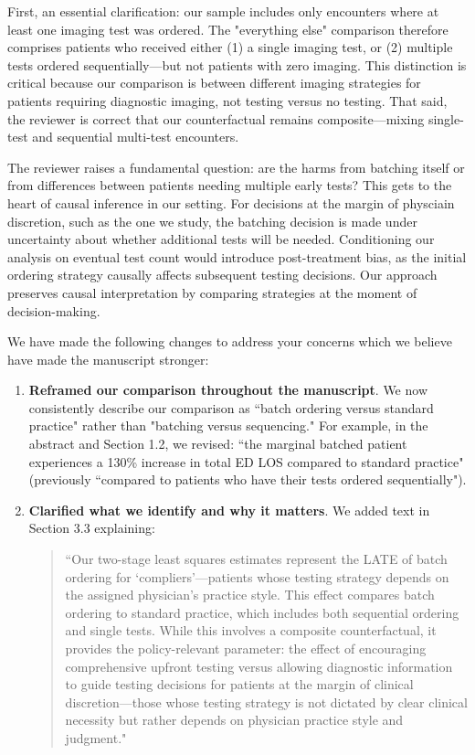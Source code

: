 \documentclass[11pt]{article}
\newcommand{\1}{\hbox{\rm 1\kern-.35em 1}}
\begin{document}
{First, an essential clarification: our sample includes only encounters where at least one imaging test was ordered. The "everything else" comparison therefore comprises patients who received either (1) a single imaging test, or (2) multiple tests ordered sequentially—but not patients with zero imaging. This distinction is critical because our comparison is between different imaging strategies for patients requiring diagnostic imaging, not testing versus no testing. That said, the reviewer is correct that our counterfactual remains composite—mixing single-test and sequential multi-test encounters.

The reviewer raises a fundamental question: are the harms from batching itself or from differences between patients needing multiple early tests? This gets to the heart of causal inference in our setting. For decisions at the margin of physciain discretion, such as the one we study, the batching decision is made under uncertainty about whether additional tests will be needed. Conditioning our analysis on eventual test count would introduce post-treatment bias, as the initial ordering strategy causally affects subsequent testing decisions. Our approach preserves causal interpretation by comparing strategies at the moment of decision-making.

We have made the following changes to address your concerns which we believe have made the manuscript stronger:

\begin{enumerate}
    \item \textbf{Reframed our comparison throughout the manuscript}. We now consistently describe our comparison as ``batch ordering versus standard practice" rather than "batching versus sequencing." For example, in the abstract and Section 1.2, we revised: ``the marginal batched patient experiences a 130\% increase in total ED LOS compared to standard practice" (previously ``compared to patients who have their tests ordered sequentially").
    
    \item \textbf{Clarified what we identify and why it matters}. We added text in Section 3.3 explaining:
    \begin{quote}
    ``Our two-stage least squares estimates represent the LATE of batch ordering for `compliers'---patients whose testing strategy depends on the assigned physician's practice style. This effect compares batch ordering to standard practice, which includes both sequential ordering and single tests. While this involves a composite counterfactual, it provides the policy-relevant parameter: the effect of encouraging comprehensive upfront testing versus allowing diagnostic information to guide testing decisions for patients at the margin of clinical discretion—those whose testing strategy is not dictated by clear clinical necessity but rather depends on physician practice style and judgment."
    \end{quote}
    

\end{enumerate}}
\end{document}
